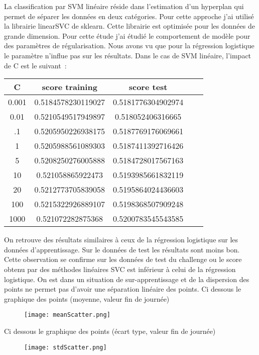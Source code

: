 \documentclass[12pt]{scrartcl} %
\begin{document}
La classification par SVM linéaire réside dans l'estimation d'un hyperplan qui permet de séparer les données en deux catégories. Pour cette approche j'ai utilisé la librairie linearSVC de sklearn. Cette librairie est optimisée pour les données de grande dimension. Pour cette étude j'ai étudié le comportement de modèle pour des paramètres de régularisation. Nous avons vu que pour la régression logistique le paramètre n'influe pas sur les résultats. Dans le cas de SVM linéaire, l'impact de C est le suivant~:
\begin{table}[h!]
\centering
\begin{adjustbox}{max width=\textwidth}
\begin{tabular}{|c|c|c|c|c|}
 C &score training & score test\\
\hline
 0.001 & 0.5184578230119027& 0.5181776304902974 \\
0.01 &  0.5210549517949897 & 0.518052406316665 \\
.1 & 0.5205950226938175 & 0.5187769176069661 \\
1 & 0.5205988561089303 & 0.5187411392716426 \\
5 &  0.5208250276005888 & 0.5184728017567163\\
10 & 0.521058865922473 & 0.5193985661832119 \\
20 & 0.5212773705839058 & 0.5195864024436603 \\
100 & 0.5215322926889107 & 0.5198368507909248 \\
1000 & 0.521072282875368 & 0.5200783545543585
\end{tabular}
\end{adjustbox}
\end{table}
On retrouve des résultats similaires à ceux de la régression logistique sur les données d'apprentissage. Sur le données de test les résultats sont moins bon. Cette observation se confirme sur les données de test du challenge ou le score obtenu par des méthodes linéaires SVC est inférieur à celui de la régression logistique. On est dans un situation de sur-apprentissage et de la dispersion des points ne permet pas d'avoir une séparation linéaire des points.
Ci dessous le graphique des points (moyenne, valeur fin de journée)
\begin{figure}[!h]
\centering
\texttt{[image: meanScatter.png]}
\end{figure}
\newline
Ci dessous le graphique des points (écart type, valeur fin de journée)
\begin{figure}[!h]
\centering
\texttt{[image: stdScatter.png]}
\end{figure}
 
\end{document}
